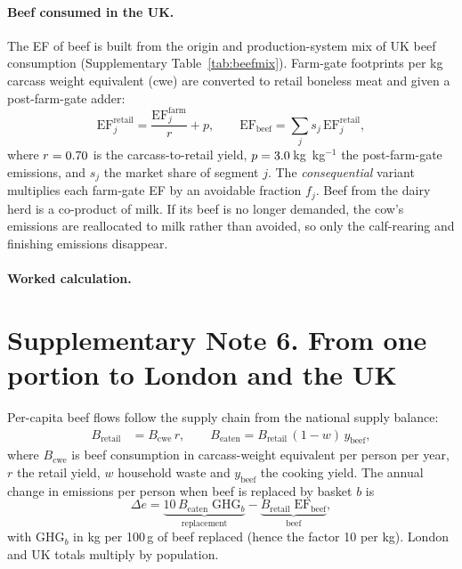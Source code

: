 \documentclass[10pt]{article}
\begin{document}
\paragraph{Beef consumed in the UK.} The EF of beef is built from the origin
and production-system mix of UK beef consumption (Supplementary Table~\ref{tab:beefmix}).
Farm-gate footprints per kg carcass weight equivalent (cwe) are converted to
retail boneless meat and given a post-farm-gate adder:
\begin{equation}
\mathrm{EF}^{\mathrm{retail}}_{j} = \frac{\mathrm{EF}^{\mathrm{farm}}_{j}}{r} + p,
\qquad \mathrm{EF}_{\mathrm{beef}} = \sum_j s_j\,\mathrm{EF}^{\mathrm{retail}}_j,
\end{equation}
where $r=0.70$ is the carcass-to-retail yield, $p=3.0$\,kg \COtwoe{}\,kg$^{-1}$
the post-farm-gate emissions, and $s_j$ the market share of segment $j$. The
\emph{consequential} variant multiplies each farm-gate EF by an avoidable
fraction $f_j$. Beef from the dairy herd is a co-product of milk. If its beef is
no longer demanded, the cow's emissions are reallocated to milk rather than
avoided, so only the calf-rearing and finishing emissions disappear.

\begin{table}[H]
\centering\small
\caption{\textbf{UK beef supply mix.} Shares of consumption, farm-gate footprints and the resulting retail EFs.}
\label{tab:beefmix}
\resizebox{\linewidth}{!}{}
\end{table}

\paragraph{Worked calculation.}


\section{Supplementary Note 6. From one portion to London and the UK}
\label{si:scaling}

Per-capita beef flows follow the supply chain from the national supply balance:
\begin{align}
B_{\mathrm{retail}} &= B_{\mathrm{cwe}}\, r, \qquad
B_{\mathrm{eaten}} = B_{\mathrm{retail}}\,(1-w)\, y_{\mathrm{beef}},
\end{align}
where $B_{\mathrm{cwe}}$ is beef consumption in carcass-weight equivalent per person per year,
$r$ the retail yield, $w$ household waste and $y_{\mathrm{beef}}$ the cooking yield.
The annual change in emissions per person when beef is replaced by basket $b$ is
\begin{equation}
\Delta e = \underbrace{10\,B_{\mathrm{eaten}}\;\mathrm{GHG}_b}_{\text{replacement}}
- \underbrace{B_{\mathrm{retail}}\;\mathrm{EF}_{\mathrm{beef}}}_{\text{beef}},
\end{equation}
with $\mathrm{GHG}_b$ in kg \COtwoe{} per 100\,g of beef replaced (hence the factor 10
per kg). London and UK totals multiply by population.
\end{document}
